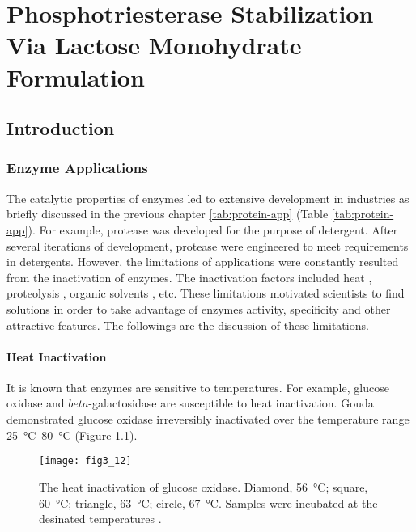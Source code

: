 \chapter{Phosphotriesterase Stabilization Via Lactose Monohydrate Formulation}
\label{chap:lactose}

\begin{refsection}

\section{Introduction}

\subsection{Enzyme Applications}

The catalytic properties of enzymes led to extensive development in industries
as briefly discussed in the previous chapter \ref{tab:protein-app} (Table
\ref{tab:protein-app}). For example, protease was developed for the purpose of
detergent\cite{Kirk2002}. After several iterations of development, protease
were engineered to meet requirements in detergents.  However, the limitations
of applications were constantly resulted from the inactivation of enzymes. The
inactivation factors included heat \cite{Shirley1995,Perdana2012,Etzel1996,Gouda2003},
proteolysis \cite{VandenBurg2002a,Ahmad2012}, organic solvents
\cite{LeJeune1997a,Izutsu2009,Stepankova2013}, etc. These limitations motivated
scientists to find solutions in order to take advantage of enzymes activity,
specificity and other attractive features. The followings are the discussion of
these limitations.

\subsubsection{Heat Inactivation}

It is known that enzymes are sensitive to temperatures\cite{Perdana2012,Etzel1996}. For
example, glucose oxidase \cite{Gouda2003} and $beta$-galactosidase
\cite{Melchers1970} are susceptible to heat inactivation. Gouda 
demonstrated glucose oxidase irreversibly inactivated over the temperature range
\SIrange{25}{80}{\celsius} \cite{Gouda2003} (Figure \ref{fig:heat-inactivation-exmaple}). 
\begin{figure}[h!] \centering \texttt{[image: fig3\_12]}
    \caption[The heat inactivation of glucose oxidase. Diamond,
    \SI{56}{\celsius};  square, \SI{60}{\celsius}; triangle, \SI{63}{\celsius};
circle, \SI{67}{\celsius}. Samples were incubated at the desinated
temperatures.]{The heat inactivation of glucose oxidase. Diamond,
    \SI{56}{\celsius};  square, \SI{60}{\celsius}; triangle, \SI{63}{\celsius};
    circle, \SI{67}{\celsius}. Samples were incubated at the desinated
temperatures \cite{Gouda2003}.} 
    \label{fig:heat-inactivation-exmaple} 
\end{figure}


\end{refsection}
